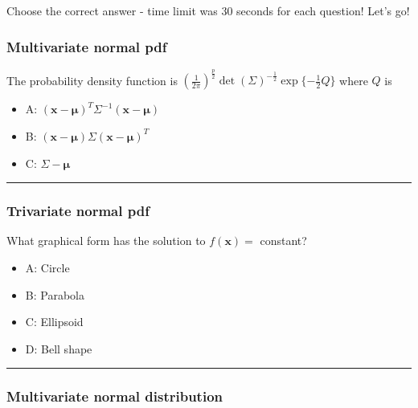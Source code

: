 \documentclass[]{article}
\providecommand{\tightlist}{%
  \setlength{\itemsep}{0pt}\setlength{\parskip}{0pt}}
\begin{document}
Choose the correct answer - time limit was 30 seconds for each question!
Let's go!

\hypertarget{multivariate-normal-pdf}{%
\subsubsection{Multivariate normal pdf}\label{multivariate-normal-pdf}}

The probability density function is
\((\frac{1}{2\pi})^\frac{p}{2}\det(\Sigma)^{-\frac{1}{2}}\exp\{-\frac{1}{2}Q\}\)
where \(Q\) is

\begin{itemize}
\tightlist
\item
  A: \((\mathbf{x}-\mathbf{\mu})^T\Sigma^{-1}(\mathbf{x}-\mathbf{\mu})\)
\item
  B: \((\mathbf{x}-\mathbf{\mu})\Sigma(\mathbf{x}-\mathbf{\mu})^T\)
\item
  C: \(\Sigma-\mathbf{\mu}\)
\end{itemize}

\begin{center}\rule{0.5\linewidth}{\linethickness}\end{center}

\hypertarget{trivariate-normal-pdf}{%
\subsubsection{Trivariate normal pdf}\label{trivariate-normal-pdf}}

What graphical form has the solution to \(f(\mathbf{x})=\) constant?

\begin{itemize}
\tightlist
\item
  A: Circle
\item
  B: Parabola
\item
  C: Ellipsoid
\item
  D: Bell shape
\end{itemize}

\begin{center}\rule{0.5\linewidth}{\linethickness}\end{center}

\hypertarget{multivariate-normal-distribution}{%
\subsubsection{Multivariate normal
distribution}\label{multivariate-normal-distribution}}
\end{document}
